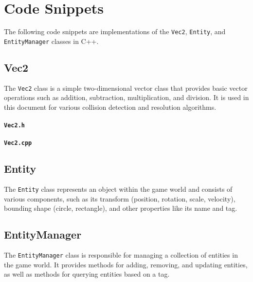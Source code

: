 \appendix
\chapter{Code Snippets}

The following code snippets are implementations of the \texttt{Vec2},
\texttt{Entity}, and \texttt{EntityManager} classes in C++.

\section{Vec2}
The \texttt{Vec2} class is a simple two-dimensional vector class that provides
basic vector operations such as addition, subtraction, multiplication, and
division. It is used in this document for various collision detection and
resolution algorithms.

\subsubsection{\texttt{Vec2.h}}
\vspace{1em}
\begin{mdframed}[linecolor=black!30!white,linewidth=.5pt,extratopheight=1em]
    
\end{mdframed}

\subsubsection{\texttt{Vec2.cpp}}
\vspace{1em}
\begin{mdframed}[linecolor=black!30!white,linewidth=.5pt,extratopheight=1em]
    
\end{mdframed}

\section{Entity}
The \texttt{Entity} class represents an object within the game world and
consists of various components, such as its transform (position, rotation,
scale, velocity), bounding shape (circle, rectangle), and other properties like
its name and tag.

\section{EntityManager}
The \texttt{EntityManager} class is responsible for managing a collection of
entities in the game world. It provides methods for adding, removing, and
updating entities, as well as methods for querying entities based on a tag.